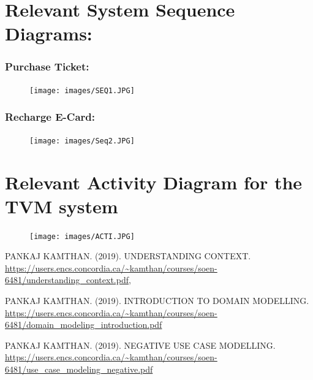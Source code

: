 \documentclass[11pt,oneside]{book}
\begin{document}
\clearpage
\section{Relevant System Sequence Diagrams:}

\subsubsection{Purchase Ticket:}
\begin{figure}[htp]
\texttt{[image: images/SEQ1.JPG]} 
    \centering
\end{figure}
\clearpage
\subsubsection{Recharge E-Card:}
\begin{figure}[htp]
\texttt{[image: images/Seq2.JPG]} 
    \centering
\end{figure}
\clearpage
\section{Relevant Activity Diagram for the TVM system}


\begin{figure}[htp]
\texttt{[image: images/ACTI.JPG]} 
    \centering
\end{figure}
\clearpage
\begin{thebibliography}{1}

   PANKAJ KAMTHAN. (2019). UNDERSTANDING CONTEXT. {\url{ https://users.encs.concordia.ca/~kamthan/courses/soen-6481/understanding_context.pdf}},

  PANKAJ KAMTHAN. (2019). INTRODUCTION TO DOMAIN MODELLING.
 {\url{https://users.encs.concordia.ca/~kamthan/courses/soen-6481/domain_modeling_introduction.pdf}}

  PANKAJ KAMTHAN. (2019). NEGATIVE USE CASE MODELLING.
 {\url{https://users.encs.concordia.ca/~kamthan/courses/soen-6481/use_case_modeling_negative.pdf}}

  
  \end{thebibliography}
\end{document}
